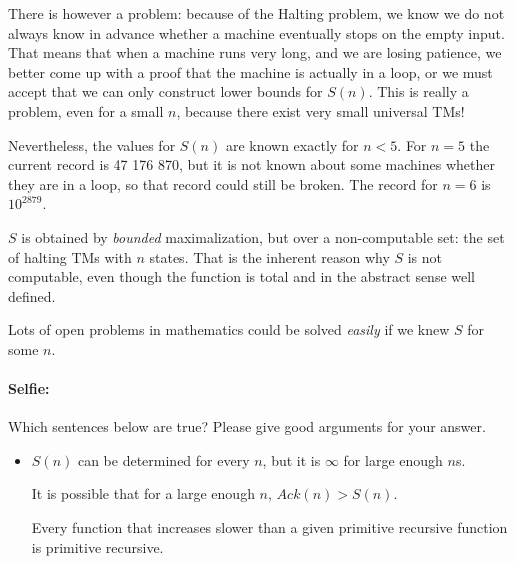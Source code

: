 There is however a problem: because of the Halting problem, we know we
do not always know in advance whether a machine eventually stops on
the empty input. That means that when a machine runs very long, and we
are losing patience, we better come up with a proof that the machine
is actually in a loop, or we must accept that we can only
construct lower bounds for $S(n)$. This is really a problem, even for
a small $n$, because there exist very small universal TMs!

Nevertheless, the values for $S(n)$ are known exactly for $n <
5$. For $n = 5$ the current record is 47 176 870, but it is not known
about some machines whether they are in a loop, so that record could
still be broken. The record for $n = 6$ is $10^{2879}$.

$S$ is obtained by {\em bounded} maximalization, but over a
non-computable set: the set of halting TMs with $n$ states. That is
the inherent reason why $S$ is not computable, even though the
function is total and in the abstract sense well defined.

Lots of open problems in mathematics could be solved {\em easily} if
we knew $S$ for some $n$.


\paragraph{Selfie:} Which sentences below are true? Please give good arguments for your answer.

\begin{itemize}
\item[] $S(n)$ can be determined for every $n$, but it is $\infty$ for
  large enough $n$s.

It is possible that for a large enough $n$, $Ack(n) > S(n)$.

Every function that increases slower than a given primitive recursive
function is primitive recursive.
\end{itemize}

